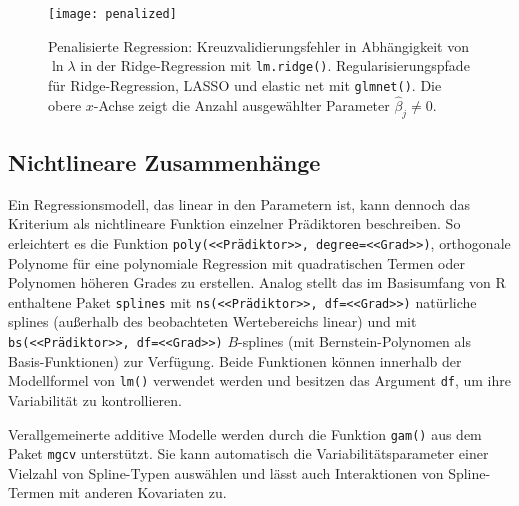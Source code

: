 \begin{figure}[ht]
\centering
\texttt{[image: penalized]}
\vspace*{-0.5em}
\caption{Penalisierte Regression: Kreuzvalidierungsfehler in Abhängigkeit von $\ln \lambda$ in der Ridge-Regression mit \lstinline!lm.ridge()!. Regularisierungspfade für Ridge-Regression, LASSO und elastic net mit \lstinline!glmnet()!. Die obere $x$-Achse zeigt die Anzahl ausgewählter Parameter $\hat{\beta}_{j} \neq 0$.}
\label{fig:penalized}
\end{figure}

\subsection{Nichtlineare Zusammenhänge}
\label{sec:lmNonlin}

Ein Regressionsmodell, das linear in den Parametern ist, kann dennoch das Kriterium als nichtlineare Funktion einzelner Prädiktoren beschreiben. So erleichtert es die Funktion \lstinline!poly(<<Prädiktor>>, degree=<<Grad>>)!, orthogonale Polynome für eine polynomiale Regression mit quadratischen Termen oder Polynomen höheren Grades zu erstellen. Analog stellt das im Basisumfang von R enthaltene Paket \lstinline!splines! mit \lstinline!ns(<<Prädiktor>>, df=<<Grad>>)! natürliche splines (außerhalb des beobachteten Wertebereichs linear) und mit \lstinline!bs(<<Prädiktor>>, df=<<Grad>>)! $B$-splines (mit Bernstein-Polynomen als Basis-Funktionen) zur Verfügung. Beide Funktionen können innerhalb der Modellformel von \lstinline!lm()! verwendet werden und besitzen das Argument \lstinline!df!, um ihre Variabilität zu kontrollieren.

Verallgemeinerte additive Modelle werden durch die Funktion \lstinline!gam()! aus dem Paket \lstinline!mgcv! \cite{Wood2006} unterstützt. Sie kann automatisch die Variabilitätsparameter einer Vielzahl von Spline-Typen auswählen und lässt auch Interaktionen von Spline-Termen mit anderen Kovariaten zu.

